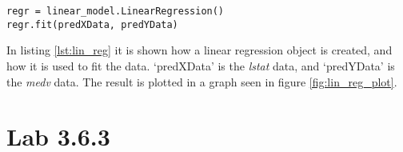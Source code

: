 \lstset{}
\begin{lstlisting}[caption={Python Linear Regression function}, label=lst:lin_reg, mathescape=true]
regr = linear_model.LinearRegression()
regr.fit(predXData, predYData)
\end{lstlisting}

In listing \ref{lst:lin_reg} it is shown how a linear regression object is created, and how it is used to fit the data. ‘predXData’ is the \emph{lstat} data, and ‘predYData’ is the \emph{medv} data.
The result is plotted in a graph seen in figure \ref{fig:lin_reg_plot}.

 

\section{Lab 3.6.3}
